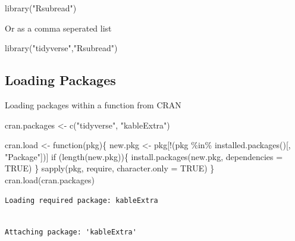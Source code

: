 \documentclass[
  letterpaper,
  DIV=11,
  numbers=noendperiod,
  landscape]{scrartcl}
\newenvironment{Shaded}{\begin{snugshade}}{\end{snugshade}}
\newcommand{\AttributeTok}[1]{\textcolor[rgb]{0.40,0.45,0.13}{#1}}
\newcommand{\ConstantTok}[1]{\textcolor[rgb]{0.56,0.35,0.01}{#1}}
\newcommand{\ControlFlowTok}[1]{\textcolor[rgb]{0.00,0.23,0.31}{#1}}
\newcommand{\FunctionTok}[1]{\textcolor[rgb]{0.28,0.35,0.67}{#1}}
\newcommand{\NormalTok}[1]{\textcolor[rgb]{0.00,0.23,0.31}{#1}}
\newcommand{\OtherTok}[1]{\textcolor[rgb]{0.00,0.23,0.31}{#1}}
\newcommand{\SpecialCharTok}[1]{\textcolor[rgb]{0.37,0.37,0.37}{#1}}
\newcommand{\StringTok}[1]{\textcolor[rgb]{0.13,0.47,0.30}{#1}}
\begin{document}
\begin{Shaded}
\begin{Highlighting}[]
\FunctionTok{library}\NormalTok{(}\StringTok{"Rsubread"}\NormalTok{)}
\end{Highlighting}
\end{Shaded}

Or as a comma seperated list

\begin{Shaded}
\begin{Highlighting}[]
\FunctionTok{library}\NormalTok{(}\StringTok{"tidyverse"}\NormalTok{,}\StringTok{"Rsubread"}\NormalTok{)}
\end{Highlighting}
\end{Shaded}

\hypertarget{loading-packages-2}{%
\subsection{Loading Packages}\label{loading-packages-2}}

Loading packages within a function from CRAN

\begin{Shaded}
\begin{Highlighting}[numbers=left,,]
\NormalTok{cran.packages }\OtherTok{\textless{}{-}} \FunctionTok{c}\NormalTok{(}\StringTok{"tidyverse"}\NormalTok{,}
                   \StringTok{"kableExtra"}\NormalTok{)}

\NormalTok{cran.load }\OtherTok{\textless{}{-}} \ControlFlowTok{function}\NormalTok{(pkg)\{}
\NormalTok{        new.pkg }\OtherTok{\textless{}{-}}\NormalTok{ pkg[}\SpecialCharTok{!}\NormalTok{(pkg }\SpecialCharTok{\%in\%} \FunctionTok{installed.packages}\NormalTok{()[, }\StringTok{"Package"}\NormalTok{])]}
        \ControlFlowTok{if}\NormalTok{ (}\FunctionTok{length}\NormalTok{(new.pkg))\{}
          \FunctionTok{install.packages}\NormalTok{(new.pkg, }\AttributeTok{dependencies =} \ConstantTok{TRUE}\NormalTok{)}
\NormalTok{          \}}
        \FunctionTok{sapply}\NormalTok{(pkg, require, }\AttributeTok{character.only =} \ConstantTok{TRUE}\NormalTok{)}
\NormalTok{\}}
\FunctionTok{cran.load}\NormalTok{(cran.packages)}
\end{Highlighting}
\end{Shaded}

\begin{verbatim}
Loading required package: kableExtra
\end{verbatim}

\begin{verbatim}

Attaching package: 'kableExtra'
\end{verbatim}
\end{document}
